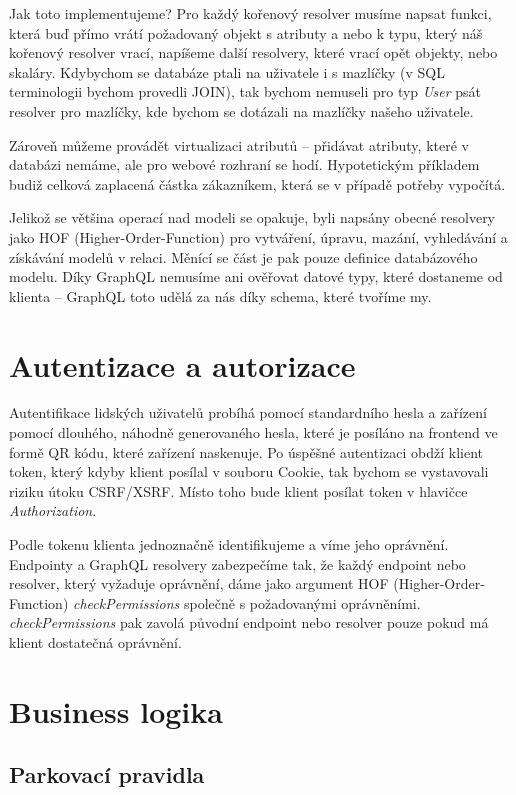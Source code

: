 Jak toto implementujeme? Pro každý kořenový resolver musíme napsat funkci, která buď přímo vrátí požadovaný objekt s atributy a nebo
k typu, který náš kořenový resolver vrací, napíšeme další resolvery, které vrací opět objekty, nebo skaláry.
Kdybychom se databáze ptali na uživatele i s
mazlíčky (v SQL terminologii bychom provedli JOIN), tak bychom nemuseli pro typ \textit{User} psát resolver pro mazlíčky, kde bychom
se dotázali na mazlíčky našeho uživatele.
\citep[viz][]{GraphQLDoc}

Zároveň můžeme provádět virtualizaci atributů -- přidávat atributy, které v databázi nemáme, ale pro webové rozhraní se hodí.
Hypotetickým příkladem budiž celková zaplacená částka zákazníkem, která se v případě potřeby vypočítá.

Jelikož se většina operací nad modeli se opakuje, byli napsány obecné resolvery jako HOF (Higher-Order-Function)
pro vytváření, úpravu, mazání, vyhledávání a získávání modelů v relaci.
Měnící se část je pak pouze definice databázového modelu. Díky GraphQL nemusíme ani ověřovat datové typy, které dostaneme od klienta --
GraphQL toto udělá za nás díky schema, které tvoříme my.

\section{Autentizace a autorizace} \label{auther_authen}

Autentifikace lidských uživatelů probíhá pomocí standardního hesla a zařízení pomocí dlouhého, náhodně generovaného hesla,
které je posíláno na frontend ve formě QR kódu, které zařízení naskenuje.
Po úspěšné autentizaci obdží klient token, který kdyby klient posílal v souboru Cookie,
tak bychom se vystavovali riziku útoku CSRF/XSRF.
Místo toho bude klient posílat token v hlavičce \textit{Authorization}.

Podle tokenu klienta jednoznačně identifikujeme a víme jeho oprávnění. Endpointy a GraphQL resolvery zabezpečíme tak,
že každý endpoint nebo resolver, který vyžaduje oprávnění, dáme jako argument HOF (Higher-Order-Function)
\textit{checkPermissions} společně s požadovanými oprávněními. \textit{checkPermissions} pak zavolá původní endpoint
nebo resolver pouze pokud má klient dostatečná oprávnění.

\section{Business logika}

\subsection{Parkovací pravidla} \label{analysis_parking_schema}

